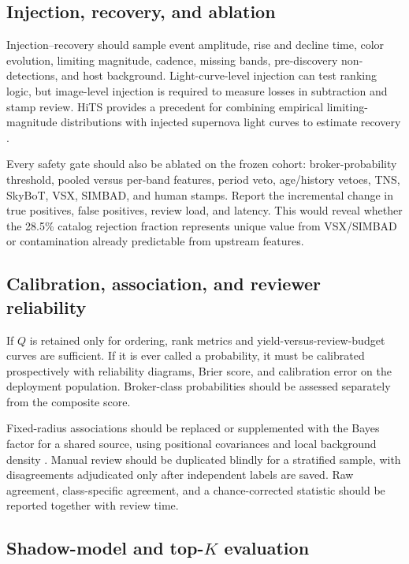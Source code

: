 \documentclass[11pt]{article}
\begin{document}
\subsection{Injection, recovery, and ablation}

Injection--recovery should sample event amplitude, rise and decline time, color evolution, limiting magnitude, cadence, missing bands, pre-discovery non-detections, and host background. Light-curve-level injection can test ranking logic, but image-level injection is required to measure losses in subtraction and stamp review. HiTS provides a precedent for combining empirical limiting-magnitude distributions with injected supernova light curves to estimate recovery \citep{forster2016}.

Every safety gate should also be ablated on the frozen cohort: broker-probability threshold, pooled versus per-band features, period veto, age/history vetoes, TNS, SkyBoT, VSX, SIMBAD, and human stamps. Report the incremental change in true positives, false positives, review load, and latency. This would reveal whether the 28.5\% catalog rejection fraction represents unique value from VSX/SIMBAD or contamination already predictable from upstream features.

\subsection{Calibration, association, and reviewer reliability}

If $Q$ is retained only for ordering, rank metrics and yield-versus-review-budget curves are sufficient. If it is ever called a probability, it must be calibrated prospectively with reliability diagrams, Brier score, and calibration error on the deployment population. Broker-class probabilities should be assessed separately from the composite score.

Fixed-radius associations should be replaced or supplemented with the Bayes factor for a shared source, using positional covariances and local background density \citep{budavari2008}. Manual review should be duplicated blindly for a stratified sample, with disagreements adjudicated only after independent labels are saved. Raw agreement, class-specific agreement, and a chance-corrected statistic should be reported together with review time.

\subsection{Shadow-model and top-$K$ evaluation}
\end{document}

